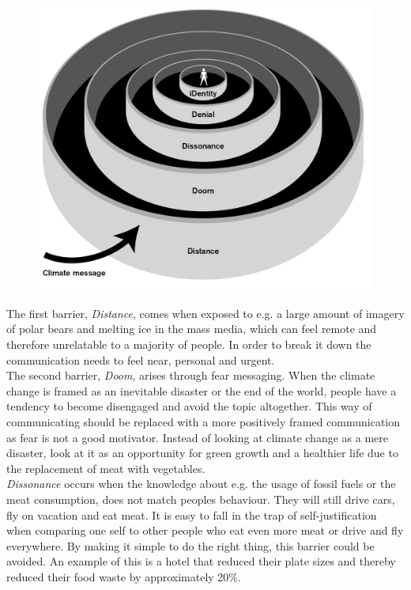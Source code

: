         \begin{figure}[H]
        	\centering
        	\includegraphics[width=0.9\linewidth]{figure/Analysis/5ds.png}
        	\label{fig:5ds}
        \end{figure}
        
        The first barrier, \textit{Distance}, comes when exposed to e.g. a large amount of imagery of polar bears and melting ice in the mass media, which can feel remote and therefore unrelatable to a majority of people\citep[p.~108]{storyAboutClimateChange}. In order to break it down the communication needs to feel near, personal and urgent\cite{the5Ds}.\\
        
        The second barrier, \textit{Doom}, arises through fear messaging. When the climate change is framed as an inevitable disaster or the end of the world, people have a tendency to become disengaged and avoid the topic altogether\citep[p.~109]{storyAboutClimateChange}. This way of communicating should be replaced with a more positively framed communication as fear is not a good motivator. Instead of looking at climate change as a mere disaster, look at it as an opportunity for green growth and a healthier life due to the replacement of meat with vegetables\cite{the5Ds}.\\
        
        \textit{Dissonance} occurs when the knowledge about e.g. the usage of fossil fuels or the meat consumption, does not match peoples behaviour. They will still drive cars, fly on vacation and eat meat. It is easy to fall in the trap of self-justification when comparing one self to other people who eat even more meat or drive and fly everywhere\citep[p.~109]{storyAboutClimateChange}. By making it simple to do the right thing, this barrier could be avoided. An example of this is a hotel that reduced their plate sizes and thereby reduced their food waste by approximately 20\%\cite{the5Ds}.\\
        
